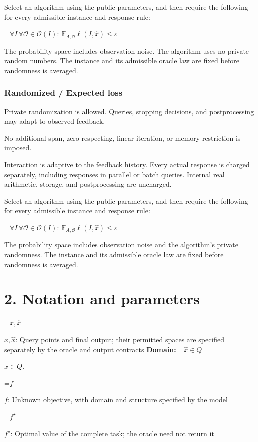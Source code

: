 \documentclass[10pt,a4paper]{article}
\newcommand{\AtlasMath}[1]{\par\begingroup\centering\setbox0=\hbox{$\displaystyle #1$}\ifdim\wd0>1.4\linewidth\typeout{ATLAS WIDE FORMULA: \the\wd0}\fi\ifdim\wd0>\linewidth\resizebox{\linewidth}{!}{\box0}\else\box0\fi\par\endgroup}
\newcommand{\AtlasInlineMath}[1]{\begingroup\setbox0=\hbox{$#1$}\ifdim\wd0>.4\linewidth\endgroup\AtlasMath{#1}\else\endgroup$#1$\fi}
\begin{document}
Select an algorithm using the public parameters, and then require the following for every admissible instance and response rule:


\AtlasMath{\forall I\,\forall\mathcal{O}\in\mathcal{O}(I):\ \mathbb{E}_{A,\mathcal{O}}\ell(I,\widehat{x})\le\varepsilon}


The probability space includes observation noise. The algorithm uses no private random numbers. The instance and its admissible oracle law are fixed before randomness is averaged.

\subsubsection{Randomized / Expected loss}
Private randomization is allowed. Queries, stopping decisions, and postprocessing may adapt to observed feedback.

No additional span, zero-respecting, linear-iteration, or memory restriction is imposed.

Interaction is adaptive to the feedback history. Every actual response is charged separately, including responses in parallel or batch queries. Internal real arithmetic, storage, and postprocessing are uncharged.

Select an algorithm using the public parameters, and then require the following for every admissible instance and response rule:


\AtlasMath{\forall I\,\forall\mathcal{O}\in\mathcal{O}(I):\ \mathbb{E}_{A,\mathcal{O}}\ell(I,\widehat{x})\le\varepsilon}


The probability space includes observation noise and the algorithm's private randomness. The instance and its admissible oracle law are fixed before randomness is averaged.

\section{2. Notation and parameters}
\AtlasInlineMath{x,\widehat{x}}: Query points and final output; their permitted spaces are specified separately by the oracle and output contracts \textbf{Domain:} \AtlasInlineMath{\widehat{x}\in Q}.

\AtlasInlineMath{f}: Unknown objective, with domain and structure specified by the model

\AtlasInlineMath{f^\star}: Optimal value of the complete task; the oracle need not return it
\end{document}
